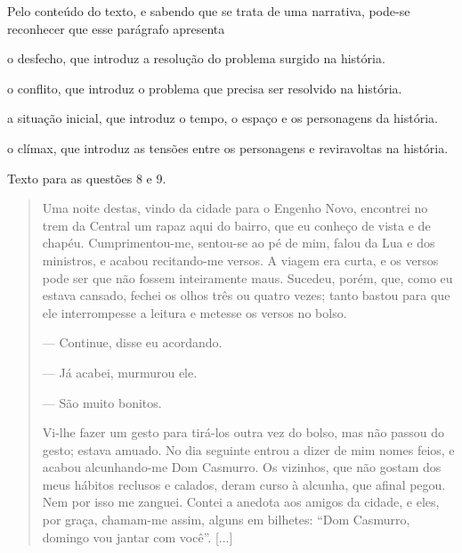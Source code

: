 
Pelo conteúdo do texto, e sabendo que se trata de uma narrativa, pode-se
reconhecer que esse parágrafo apresenta

\begin{escolha}
\item o desfecho, que introduz a resolução do problema surgido na história.

\item o conflito, que introduz o problema que precisa ser resolvido na
história.

\item a situação inicial, que introduz o tempo, o espaço e os personagens
da história.

\item o clímax, que introduz as tensões entre os personagens e reviravoltas
na história.
\end{escolha}

Texto para as questões 8 e 9.

\begin{quote}
Uma noite destas, vindo da cidade para o Engenho Novo, encontrei no trem
da Central um rapaz aqui do bairro, que eu conheço de vista e de chapéu.
Cumprimentou-me, sentou-se ao pé de mim, falou da Lua e dos ministros, e
acabou recitando-me versos. A viagem era curta, e os versos pode ser que
não fossem inteiramente maus. Sucedeu, porém, que, como eu estava
cansado, fechei os olhos três ou quatro vezes; tanto bastou para que ele
interrompesse a leitura e metesse os versos no bolso.

--- Continue, disse eu acordando.

--- Já acabei, murmurou ele.

--- São muito bonitos.

Vi-lhe fazer um gesto para tirá-los outra vez do bolso, mas não passou
do gesto; estava amuado. No dia seguinte entrou a dizer de mim nomes
feios, e acabou alcunhando-me Dom Casmurro. Os vizinhos, que não gostam
dos meus hábitos reclusos e calados, deram curso à alcunha, que afinal
pegou. Nem por isso me zanguei. Contei a anedota aos amigos da cidade, e
eles, por graça, chamam-me assim, alguns em bilhetes: ``Dom Casmurro,
domingo vou jantar com você''. {[}...{]}
\end{quote}


